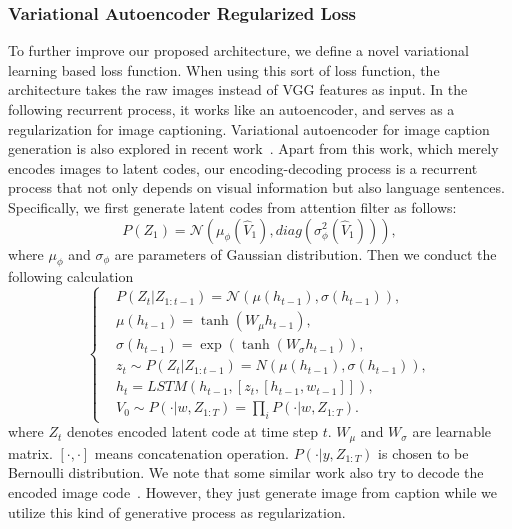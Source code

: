\documentclass[10pt,twocolumn,letterpaper]{article}
\begin{document}
	\subsubsection{Variational Autoencoder Regularized Loss}
	To further improve our proposed architecture, we define a novel variational learning based loss function. When using this sort of loss function, the architecture takes the raw images instead of VGG features as input. In the following recurrent process, it works like an autoencoder, and serves as a regularization for image captioning. Variational autoencoder for image caption generation is also explored in recent work~\cite{pu2016variational}. Apart from this work, which merely encodes images to latent codes, our encoding-decoding process is a recurrent process that not only depends on visual information but also language sentences.
	Specifically, we first generate latent codes from attention filter as follows:
	\begin{equation}
	P({Z_1}) = \mathcal{N}({\mu _\phi }({\hat{V}_{1}}),diag(\sigma _\phi ^2({\hat{V}_{1}}))),
	\end{equation}
	where $\mu _ \phi $ and $\sigma _\phi $ are parameters of Gaussian distribution. Then we conduct the following calculation
	\begin{equation}
	\left\{
	\begin{aligned}
	&P({Z_t}|{Z_{1:t - 1}}) = \mathcal{N}(\mu ({h_{t - 1}}),\sigma ({h_{t - 1}})),\\
	&\mu ({h_{t - 1}}) = \tanh ({W_\mu }{h_{t - 1}}),\\
	&\sigma ({h_{t - 1}}) = \exp (\tanh ({W_\sigma }{h_{t - 1}})),\\
	&{z_t}\sim P({Z_t}|{Z_{1:t - 1}}) = N(\mu ({h_{t - 1}}),\sigma ({h_{t - 1}})),\\
	&{h_t} = LSTM({h_{t - 1}},[{z_t},[{h_{t - 1}},{w_{t - 1}}]]),\\
	&V_0\sim P( \cdot |w,{Z_{1:T}}) = \prod\limits_i {P( \cdot |w,{Z_{1:T}})}.
	\end{aligned}\right.
	\end{equation}
	where $Z_t$ denotes encoded latent code at time step $t$. $W_\mu$ and $W_\sigma$ are learnable matrix. $[ \cdot,\cdot ]$ means concatenation operation. $P( \cdot |y,{Z_{1:T}})$ is chosen to be Bernoulli distribution. We note that some similar work also try to decode the encoded image code~\cite{gregor2015draw,mansimov2015generating}. However, they just generate image from caption while we utilize this kind of generative process as regularization.
	
\end{document}
